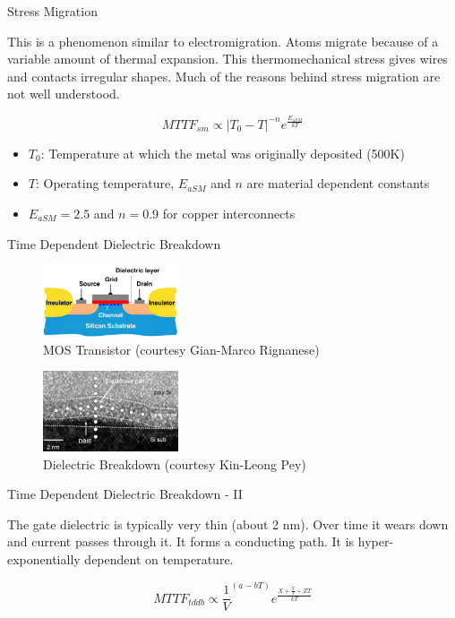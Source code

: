 \documentclass[xcolor=pdftex,dvipsnames,table,svgnames,x11names]{beamer}
\begin{document}
\begin{frame}{Stress Migration}

 \begin{block}{}
  This is a phenomenon similar to electromigration. Atoms migrate because of a variable amount of thermal
expansion. This thermomechanical stress gives wires and contacts irregular shapes. Much of the reasons
behind stress migration are not well understood.
  \end{block}

\begin{displaymath}
 MTTF_{sm} \propto |T_0 - T|^{-n}e^{\frac{E_{aSM}}{kT}} 
\end{displaymath}

\begin{itemize}
\item $T_0$: Temperature at which the metal was originally deposited (500K)
\item $T$: Operating temperature, $E_{aSM}$ and $n$ are material dependent constants
\item $E_{aSM}=2.5$ and $n=0.9$ for copper interconnects
\end{itemize}

\end{frame}

\begin{frame}{Time Dependent Dielectric Breakdown}
\begin{figure}[h]
 \includegraphics[width=4cm]{mos}
\caption{\footnotesize MOS Transistor (courtesy Gian-Marco Rignanese)}
\end{figure}

\begin{figure}[h]
 \includegraphics[width=4cm]{dielectric_breakdown}
\caption{\footnotesize Dielectric Breakdown (courtesy Kin-Leong Pey)}
\end{figure}
\end{frame}

\begin{frame} {Time Dependent Dielectric Breakdown - II}
\begin{block}{}
 The gate dielectric is typically very thin (about 2 nm). Over time it wears down and 
current passes through it. It forms a conducting path. It is hyper-exponentially
dependent on temperature.
\end{block}

\begin{displaymath}
 MTTF_{tddb} \propto \frac{1}{V}^{(a-bT)}e^{\frac{X+\frac{Y}{T} +ZT}{kT}}
\end{displaymath}

\end{frame}
\end{document}
